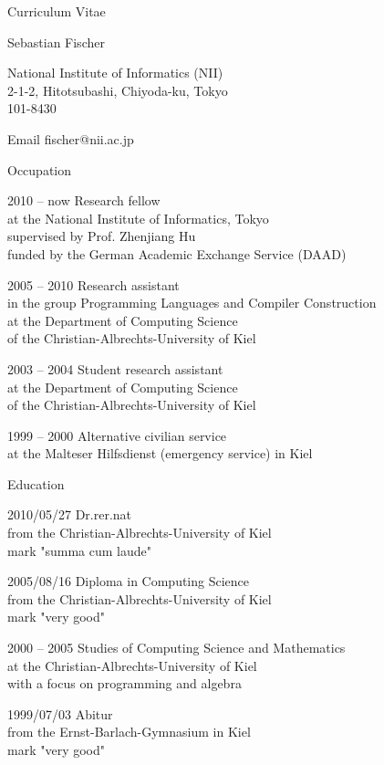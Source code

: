 \documentclass[a4paper,12pt,DIV=12]{scrartcl}
\begin{document}
\begin{cv}{Curriculum Vitae}
  \begin{cvlist}{}
  \item Sebastian Fischer
  \item
    National Institute of Informatics (NII)\\
    2-1-2, Hitotsubashi, Chiyoda-ku, Tokyo\\
    101-8430
  \item[Email] fischer@nii.ac.jp
  \end{cvlist}
  \begin{cvlist}{Occupation}
  \item[2010 -- now]
    Research fellow\\
    at the National Institute of Informatics, Tokyo\\
    supervised by Prof. Zhenjiang Hu\\
    funded by the German Academic Exchange Service (DAAD)
  \item[2005 -- 2010]
    Research assistant\\
    in the group Programming Languages and Compiler Construction\\
    at the Department of Computing Science\\
    of the Christian-Albrechts-University of Kiel
  \item[2003 -- 2004]
    Student research assistant\\
    at the Department of Computing Science\\
    of the Christian-Albrechts-University of Kiel
  \item[1999 -- 2000]
    Alternative civilian service\\
    at the Malteser Hilfsdienst (emergency service) in Kiel
  \end{cvlist}
  \begin{cvlist}{Education}
  \item[2010/05/27]
    Dr.rer.nat\\
    from the Christian-Albrechts-University of Kiel\\
    mark "summa cum laude"
  \item[2005/08/16] 
    Diploma in Computing Science\\
    from the Christian-Albrechts-University of Kiel\\
    mark "very good"
  \item[2000 -- 2005] 
    Studies of Computing Science and Mathematics\\
    at the Christian-Albrechts-University of Kiel\\
    with a focus on programming and algebra
  \item[1999/07/03]
    Abitur\\
    from the Ernst-Barlach-Gymnasium in Kiel\\
    mark "very good"
  \end{cvlist}
\end{cv}
\end{document}
